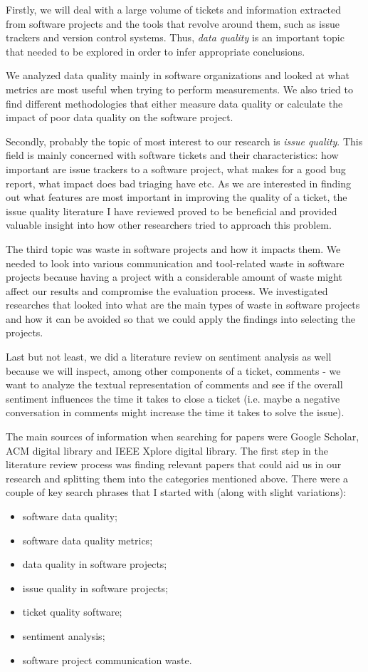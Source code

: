 \documentclass{mprop}
\begin{document}
Firstly, we will deal with a large volume of tickets and information extracted 
from software projects and the tools that revolve around them, such as issue 
trackers and version control systems. Thus, \emph{data quality} is an important 
topic that needed to be explored in order to infer appropriate conclusions. 

We analyzed data quality mainly in software organizations and looked at what metrics
are most useful when trying to perform measurements. We also tried to find different
methodologies that either measure data quality or calculate the impact of poor data
quality on the software project. 

Secondly, probably the topic of most interest to our research is \emph{issue quality}.
This field is mainly concerned with software tickets and their characteristics: how
important are issue trackers to a software project, what makes for a good bug report,
what impact does bad triaging have etc. As we are interested in finding out what
features are most important in improving the quality of a ticket, the issue quality
literature I have reviewed proved to be beneficial and provided valuable insight into
how other researchers tried to approach this problem.

The third topic was waste in software projects and how it impacts them. We needed to
look into various communication and tool-related waste in software projects because
having a project with a considerable amount of waste might affect our results and
compromise the evaluation process. We investigated researches that looked into what
are the main types of waste in software projects and how it can be avoided so that
we could apply the findings into selecting the projects.

Last but not least, we did a literature review on sentiment analysis as well 
because we will inspect, among other components of a ticket, comments - we want 
to analyze the textual representation of comments and see if the overall 
sentiment influences the time it takes to close a ticket (i.e. maybe a negative 
conversation in comments might increase the time it takes to solve the issue).

The main sources of information when searching for papers were Google Scholar, 
ACM digital library and IEEE Xplore digital library. The first step in the 
literature review process was finding relevant papers that could aid us in
our research and splitting them into the categories mentioned above. There were
a couple of key search phrases that I started with (along with slight variations):
  \begin{itemize}
    \item software data quality;
    \item software data quality metrics;
    \item data quality in software projects;
    \item issue quality in software projects;
    \item ticket quality software;
    \item sentiment analysis;
    \item software project communication waste.
  \end{itemize}
\end{document}
